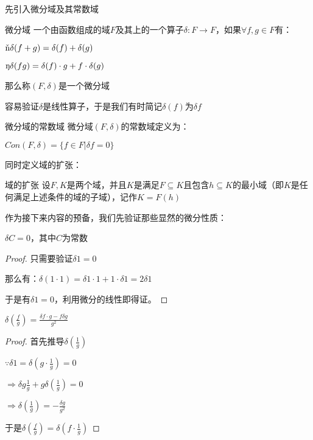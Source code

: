 \documentclass[12pt, a4paper, oneside, UTF8]{ctexbook}
\begin{document}
			先引入微分域及其常数域
			\begin{para}{0}
					\begin{defn}{微分域}{}
						一个由函数组成的域$F$及其上的一个算子$\delta:F \rightarrow F$，如果$\forall f,g \in F$有：
						
						$\ding{172} \delta(f+g) = \delta(f)+\delta(g)$
						
						$\ding{173} \delta(fg) = \delta(f)\cdot g+f \cdot \delta(g)$
						
						那么称$(F,\delta)$是一个微分域
					\end{defn}
					容易验证$\delta$是线性算子，于是我们有时简记$\delta(f)$为$\delta f$
					\begin{defn}{微分域的常数域}{}
						微分域$(F,\delta)$的常数域定义为：
						
						$Con (F,\delta) =\{f \in F| \delta f = 0\}$
					\end{defn}
					同时定义域的扩张：
					\begin{defn}{域的扩张}{}
						设$F,K$是两个域，并且$K$是满足$F \subseteq K$且包含$h \subseteq K$的最小域（即$K$是任何满足上述条件的域的子域），记作$K = F(h)$
					\end{defn}
					作为接下来内容的预备，我们先验证那些显然的微分性质：
					\begin{proposition}
						$\delta C = 0$，其中$C$为常数 
					\end{proposition}
					\begin{proof}
						只需要验证$\delta 1 = 0$
						
						那么有：$\delta (1\cdot 1) = \delta 1 \cdot 1 + 1 \cdot \delta 1=2\delta 1$
						
						于是有$\delta 1 = 0$，利用微分的线性即得证。
					\end{proof}
					\begin{proposition}
						$\delta \left(\frac{f}{g}\right)=\frac{\delta f \cdot g - f \delta g}{g^2}$
					\end{proposition}
					\begin{proof}
						首先推导$\delta \left(\frac{1}{g}\right)$
						
						$\because \delta 1 = \delta \left(g \cdot \frac{1}{g}\right) = 0$
						
						$\Rightarrow \delta g \frac{1}{g}+g \delta \left(\frac{1}{g}\right)=0$
						
						$\Rightarrow \delta \left(\frac{1}{g}\right) = -\frac{\delta g}{g^2}$
						
						于是$\delta \left(\frac{f}{g}\right) = \delta \left(f \cdot \frac{1}{g}\right)$
						

\end{proof}
\end{para}
\end{document}
